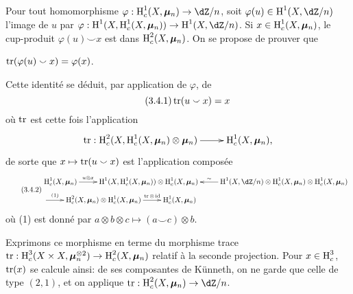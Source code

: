 \subsection{}\label{V:3-3}

Pour tout homomorphisme $\varphi:\h_c^1(X,\dmu_n)\to \dZ/n$, soit 
$\varphi(u)\in \h^1(X,\dZ/n)$ l'image de $u$ par 
$\varphi:\h^1(X,\h_c^1(X,\dmu_n)) \to \h^1(X,\dZ/n)$. Si 
$x\in \operatorname{H}_c^1(X,{\bm\mu}_n)$, le cup-produit $\varphi(u)\smallsmile x$ est dans 
$\operatorname{H}_c^2(X,{\bm\mu}_n)$. On se propose de prouver que 





\begin{proposition_}\label{V:3-4}
$\operatorname{tr}(\varphi(u)\smallsmile x) = \varphi(x)$.
\end{proposition_}

Cette identité se déduit, par application de $\varphi$, de 
\begin{equation*}\tag{3.4.1}\label{V:eq:3-4-1}
  \operatorname{tr}(u\smallsmile x) = x 
\end{equation*}
où $\operatorname{tr}$ est cette fois l'application 
\[\xymatrix{
  \tr:\h_c^2(X,\h_c^1(X,\dmu_n)\otimes\dmu_n) \ar[r] 
    & \h_c^1(X,\dmu_n) \text{,}
}\]
de sorte que $x\mapsto \operatorname{tr}(u\smallsmile x)$ est l'application composée 
\begin{equation*}\tag{3.4.2}\label{V:eq:3-4-2}
\begin{aligned}
&\xymatrix{
  \h_c^1(X,\dmu_n) \ar[r]^-{u\otimes x} 
    & \h^1(X,\h_c^1(X,\dmu_n)) \otimes \h_c^1(X,\dmu_n) 
    & \ar[l]_-\sim \h^1(X,\dZ/n)\otimes \h_c^1(X,\dmu_n) \otimes \h_c^1(X,\dmu_n)} \\ &\xymatrix{
    \ar[r]^-{(1)} 
      & \h_c^2(X,\dmu_n) \otimes \h_c^1(X,\dmu_n) \ar[r]^-{\tr\otimes\operatorname{id}} 
      & \h_c^1(X,\dmu_n)
}
\end{aligned}
\end{equation*}
où (1) est donné par 
$a\otimes b\otimes c\mapsto (a\smallsmile c)\otimes b$. 

Exprimons ce morphisme en terme du morphisme trace 
$\operatorname{tr}:\operatorname{H}_c^3(X\times X,{\bm\mu}_n^{\otimes 2}) \to \operatorname{H}_c^2(X,{\bm\mu}_n)$ relatif à la 
seconde projection. Pour $x\in \operatorname{H}_c^3$, $\operatorname{tr}(x)$ se calcule ainsi: de ses 
composantes de K\"unneth, on ne garde que celle de type $(2,1)$, et on applique 
$\tr:\h_c^2(X,\dmu_n) \to \dZ/n$. 

